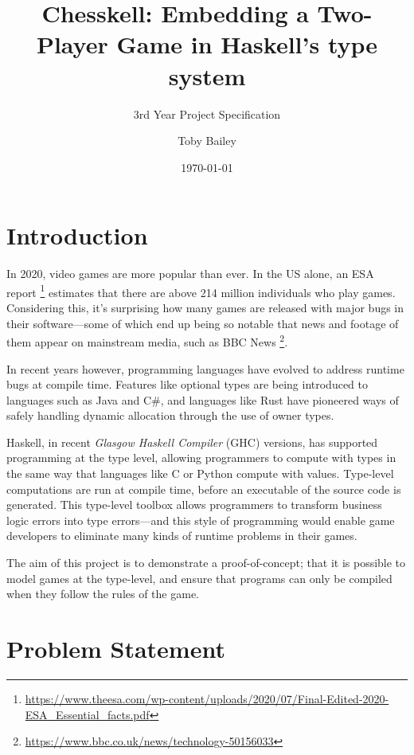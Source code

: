 \documentclass[12pt, a4paper]{scrartcl}
\title{Chesskell: Embedding a Two-Player Game in Haskell's type system}
\subtitle{3rd Year Project Specification}
\author{Toby Bailey}
\date{\today}
\begin{document}
\begin{titlepage}
    \maketitle
    \tableofcontents
\end{titlepage}

\section{Introduction}

In 2020, video games are more popular than ever. In the US alone, an ESA report \footnote{\url{https://www.theesa.com/wp-content/uploads/2020/07/Final-Edited-2020-ESA_Essential_facts.pdf}} estimates that there are above 214 million individuals who play games. Considering this, it's surprising how many games are released with major bugs in their software---some of which end up being so notable that news and footage of them appear on mainstream media, such as BBC News \footnote{\url{https://www.bbc.co.uk/news/technology-50156033}}.

In recent years however, programming languages have evolved to address runtime bugs at compile time. Features like optional types are being introduced to languages such as Java and C\#, and languages like Rust have pioneered ways of safely handling dynamic allocation through the use of owner types.


Haskell, in recent \emph{Glasgow Haskell Compiler} (GHC) versions, has supported programming at the type level, allowing programmers to compute with types in the same way that languages like C or Python compute with values. Type-level computations are run at compile time, before an executable of the source code is generated. This type-level toolbox allows programmers to transform business logic errors into type errors---and this style of programming would enable game developers to eliminate many kinds of runtime problems in their games.

The aim of this project is to demonstrate a proof-of-concept; that it is possible to model games at the type-level, and ensure that programs can only be compiled when they follow the rules of the game.

\section{Problem Statement}
\end{document}
